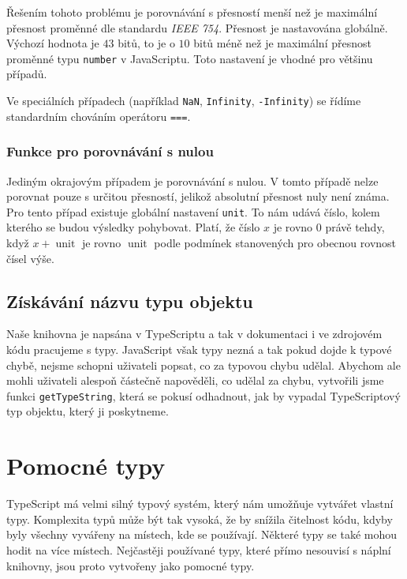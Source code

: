Řešením tohoto problému je porovnávání s přesností menší než je maximální přesnost proměnné dle standardu \textit{IEEE 754}. 
Přesnost je nastavována globálně.
Výchozí hodnota je $43$ bitů, to je o $10$ bitů méně než je maximální přesnost proměnné typu \texttt{number} v JavaScriptu.
Toto nastavení je vhodné pro většinu případů.

Ve speciálních případech (například \texttt{NaN}, \texttt{Infinity}, \texttt{-Infinity}) se řídíme standardním chováním operátoru \texttt{===}.\cite{geometryjs:wiki:helpers}

\subsubsection[Rovnost nule]{Funkce pro porovnávání s nulou}
\label{subsubsec:helper-function-compare-to-zero}

Jediným okrajovým případem je porovnávání s nulou.
V tomto případě nelze porovnat pouze s určitou přesností, jelikož absolutní přesnost nuly není známa.
Pro tento případ existuje globální nastavení \texttt{unit}. 
To nám udává číslo, kolem kterého se budou výsledky pohybovat. 
Platí, že číslo $x$ je rovno 0 právě tehdy, když $x + \mathop{unit}$ je rovno $\mathop{unit}$ podle podmínek stanovených pro obecnou rovnost čísel výše.\cite{geometryjs:source:interfaces:float.ts}

\subsection[Název typu]{Získávání názvu typu objektu}
\label{subsec:getting-type-name}

Naše knihovna je napsána v TypeScriptu a tak v dokumentaci i ve zdrojovém kódu pracujeme s typy.
JavaScript však typy nezná\cite{mdn:object-type} a tak pokud dojde k typové chybě, nejsme schopni uživateli popsat, co za typovou chybu udělal.
Abychom ale mohli uživateli alespoň částečně napověděli, co udělal za chybu, vytvořili jsme funkci \texttt{getTypeString}\cite{geometryjs:source:helpers:getTypeString.ts}, která se pokusí odhadnout, jak by vypadal TypeScriptový typ objektu, který ji poskytneme.

\section{Pomocné typy}
\label{sec:helper-types}

TypeScript má velmi silný typový systém, který nám umožňuje vytvářet vlastní typy.
Komplexita typů může být tak vysoká, že by snížila čitelnost kódu, kdyby byly všechny vyvářeny na místech, kde se používají.
Některé typy se také mohou hodit na více místech.
Nejčastěji používané typy, které přímo nesouvisí s náplní knihovny, jsou proto vytvořeny jako pomocné typy.

